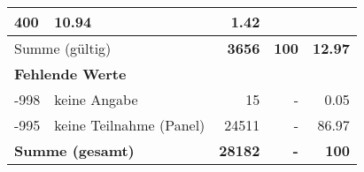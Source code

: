 \begin{longtable}{lXrrr}
       \num{400} &
       \num[round-mode=places,round-precision=2]{10,94} &
         \num[round-mode=places,round-precision=2]{1,42} \\
     \midrule
     \multicolumn{2}{l}{Summe (gültig)} &
       \textbf{\num{3656}} &
     \textbf{100} &
       \textbf{\num[round-mode=places,round-precision=2]{12,97}} \\
     \multicolumn{5}{l}{\textbf{Fehlende Werte}}\\
       -998 &
       keine Angabe &
         \num{15} &
        - &
         \num[round-mode=places,round-precision=2]{0,05} \\
       -995 &
       keine Teilnahme (Panel) &
         \num{24511} &
        - &
         \num[round-mode=places,round-precision=2]{86,97} \\
     \midrule
     \multicolumn{2}{l}{\textbf{Summe (gesamt)}} &
          \textbf{\num{28182}} &
        \textbf{-} &
        \textbf{100} \\
     \bottomrule
     \end{longtable}
     
